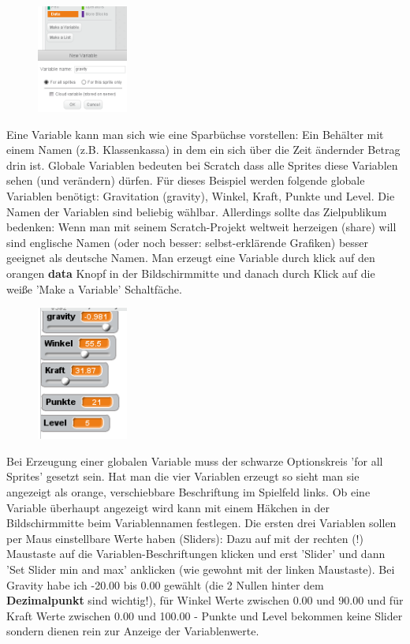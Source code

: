 \documentclass[10pt,a4paper,ngerman,twoside]{article} %
\begin{document}
\begin{multicols}{3}
\begin{figure}
\includegraphics[width=3cm]{scratch/makevar.png}
\end{figure}
Eine Variable kann man sich wie eine Sparbüchse vorstellen: Ein Behälter mit einem Namen (z.B. Klassenkassa) in dem ein sich über die Zeit ändernder Betrag drin ist. Globale Variablen bedeuten bei Scratch dass alle Sprites diese Variablen sehen (und verändern) dürfen. Für dieses Beispiel werden folgende globale Variablen benötigt: Gravitation (gravity), Winkel, Kraft, Punkte und Level. Die Namen der Variablen sind beliebig wählbar. Allerdings sollte das Zielpublikum bedenken: Wenn man mit seinem Scratch-Projekt weltweit herzeigen (share) will sind englische Namen (oder noch besser: selbst-erklärende Grafiken) besser geeignet als deutsche Namen. Man erzeugt eine Variable durch klick auf den orangen \textbf{data} Knopf in der Bildschirmmitte und danach durch Klick auf die weiße 'Make a Variable' Schaltfäche.


\begin{figure}
\includegraphics[width=3cm]{scratch/fsliders.png}
\end{figure}
Bei Erzeugung einer globalen Variable muss der schwarze Optionskreis 'for all Sprites' gesetzt sein. Hat man die vier Variablen erzeugt so sieht man sie angezeigt als
orange, verschiebbare Beschriftung im Spielfeld links. Ob eine Variable überhaupt angezeigt wird kann mit einem Häkchen in der Bildschirmmitte beim Variablennamen festlegen. Die ersten drei Variablen sollen per Maus einstellbare Werte haben (Sliders): Dazu auf mit der rechten (!) Maustaste auf die Variablen-Beschriftungen klicken und erst 'Slider' und dann 'Set Slider min and max' anklicken (wie gewohnt mit der linken Maustaste). Bei Gravity habe ich -20.00 bis 0.00 gewählt (die 2 Nullen hinter dem \textbf{Dezimalpunkt} sind wichtig!), für Winkel Werte zwischen 0.00 und 90.00 und für Kraft Werte zwischen 0.00 und 100.00 - Punkte und Level bekommen keine Slider sondern dienen rein zur Anzeige der Variablenwerte.




\end{multicols}
\end{document}
